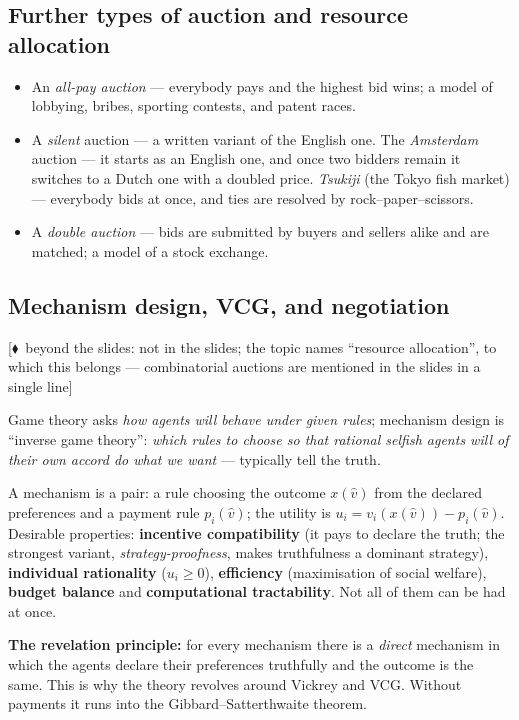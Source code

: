\documentclass[11pt,a4paper]{article}
\theoremstyle{definition}
\providecommand{\uv}[1]{``#1''}
\newcommand{\mimoq}[1]{\textcolor{markcol}{\textsf{\footnotesize[$\blacklozenge$~beyond the slides: #1]}}}
\begin{document}
\subsection{Further types of auction and resource allocation}

\begin{itemize}
\item An \emph{all-pay auction} --- everybody pays and the highest bid wins; a model of lobbying,
  bribes, sporting contests, and patent races.
\item A \emph{silent} auction --- a written variant of the English one. The \emph{Amsterdam} auction ---
  it starts as an English one, and once two bidders remain it switches to a Dutch one with a doubled
  price. \emph{Tsukiji} (the Tokyo fish market) --- everybody bids at once, and ties are resolved by
  rock--paper--scissors.
\item A \emph{double auction} --- bids are submitted by buyers and sellers alike and are matched; a
  model of a stock exchange.
\end{itemize}

\subsection{Mechanism design, VCG, and negotiation}

\noindent\mimoq{not in the slides; the topic names \uv{resource allocation}, to which this
belongs --- combinatorial auctions are mentioned in the slides in a single line}

\begin{defbox}
Game theory asks \emph{how agents will behave under given rules}; mechanism design is
\uv{inverse game theory}: \emph{which rules to choose so that rational selfish agents will of
their own accord do what we want} --- typically tell the truth.

A mechanism is a pair: a rule choosing the outcome $x(\hat v)$ from the declared preferences and
a payment rule $p_i(\hat v)$; the utility is $u_i = v_i(x(\hat v)) - p_i(\hat v)$.
Desirable properties: \textbf{incentive compatibility} (it pays to declare the truth; the
strongest variant, \emph{strategy-proofness}, makes truthfulness a dominant strategy),
\textbf{individual rationality} ($u_i \ge 0$), \textbf{efficiency} (maximisation of social
welfare), \textbf{budget balance} and \textbf{computational tractability}. Not all of them can
be had at once.

\textbf{The revelation principle:} for every mechanism there is a \emph{direct} mechanism in
which the agents declare their preferences truthfully and the outcome is the same. This is why
the theory revolves around Vickrey and VCG. Without payments it runs into the
Gibbard--Satterthwaite theorem.
\end{defbox}
\end{document}
